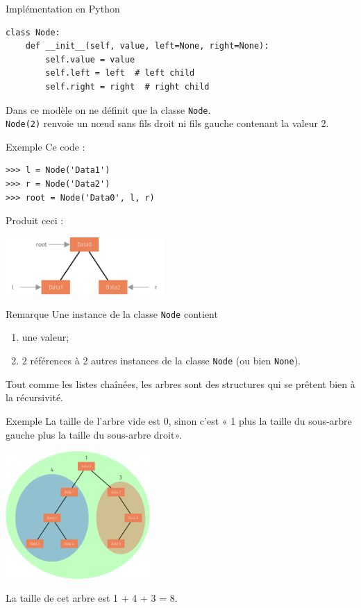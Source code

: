 \documentclass[10pt]{nsibeamer}
\begin{document}
\begin{frame}[fragile]{Implémentation en Python}
\begin{verbatim}
class Node:
    def __init__(self, value, left=None, right=None):
        self.value = value
        self.left = left  # left child
        self.right = right  # right child
\end{verbatim}


\pause
Dans ce modèle on ne définit que la classe \texttt{Node}.\\\pause \texttt{Node(2)} renvoie un n\oe ud sans fils droit ni fils gauche contenant la valeur 2.
\end{frame}
\begin{frame}[fragile]{Exemple}
Ce code :
\begin{verbatim}
>>> l = Node('Data1')
>>> r = Node('Data2')
>>> root = Node('Data0', l, r)
\end{verbatim}
\pause
Produit ceci : 
    \begin{center}
    \includegraphics[width=6cm]{img/arbre_bin_4}
\end{center}
\end{frame}
\begin{frame}{Remarque}
Une instance de la classe \texttt{Node} contient 
\begin{enumerate}[--]
	\item une valeur;
    \item 2 références à 2 autres instances de la classe \texttt{Node} (ou bien \texttt{None}).
\end{enumerate}  \pause
Tout comme les listes chaînées, les arbres sont des structures qui se prêtent bien à la récursivité.
\end{frame}
\begin{frame}{Exemple}
    La taille de l'arbre vide est 0, sinon c'est « 1 plus la taille du sous-arbre gauche plus la taille du sous-arbre droit».\pause
    \begin{center}
        \includegraphics[width=5.5cm]{img/taille}
    \end{center}
La taille de cet arbre est 1 + 4 + 3 = 8.
\end{frame}
\end{document}
